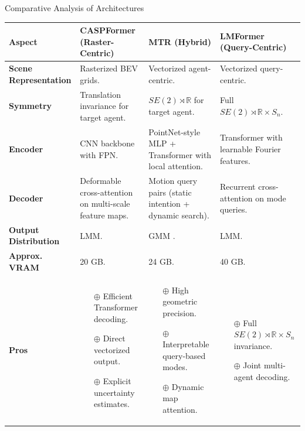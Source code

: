 \documentclass[10pt,aspectratio=169]{beamer}
\newcommand{\greenoplus}{\textcolor{mygreen}{\( \oplus \)}}
\begin{document}
\begin{frame}{Comparative Analysis of Architectures}
\begin{table}[ht]
\centering
\tiny
\renewcommand{\arraystretch}{1.2}
\begin{tabular}{|p{1.9cm}|p{3.9cm}|p{3.9cm}|p{3.9cm}|}
    \hline
    \textbf{Aspect} & \textbf{CASPFormer (Raster-Centric)} & \textbf{MTR (Hybrid)} & \textbf{LMFormer (Query-Centric)} \\
    \hline
    \textbf{Scene Representation} & Rasterized BEV grids. & Vectorized agent-centric. & Vectorized query-centric. \\
    \hline
    \textbf{Symmetry} & Translation invariance for target agent. & \(SE(2) \rtimes \mathbb{R} \) for target agent. & Full \(SE(2) \rtimes \mathbb{R} \times S_n\). \\
    \hline
    \textbf{Encoder} & CNN backbone with FPN.  & PointNet-style MLP + Transformer with local attention. & Transformer with learnable Fourier features. \\
    \hline
    \textbf{Decoder} & Deformable cross-attention on multi-scale feature maps. & Motion query pairs (static intention + dynamic search). & Recurrent cross-attention on mode queries. \\
    \hline
    \textbf{Output Distribution} & LMM. & GMM . & LMM. \\
    \hline
    \textbf{Approx. VRAM} & 20 GB. & 24 GB. & 40 GB. \\
    \hline
    \textbf{Pros} &
    \begin{itemize}
        \item[\greenoplus] Efficient Transformer decoding.
        \item[\greenoplus] Direct vectorized output.
        \item[\greenoplus] Explicit uncertainty estimates.
    \end{itemize} &
    \begin{itemize}
        \item[\greenoplus] High geometric precision.
        \item[\greenoplus] Interpretable query-based modes.
        \item[\greenoplus] Dynamic map attention.
    \end{itemize} &
    \begin{itemize}
        \item[\greenoplus] Full \( SE(2) \rtimes \mathbb{R} \times S_n\) invariance.
        \item[\greenoplus] Joint multi-agent decoding.

\end{itemize}
\end{tabular}
\end{table}
\end{frame}
\end{document}
